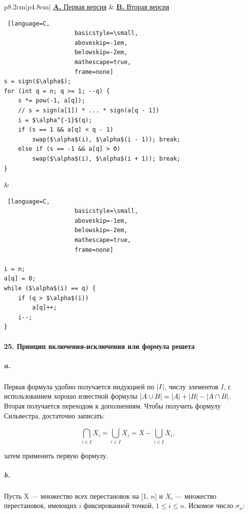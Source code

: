 \documentclass{../../template/mai_book}
\DeclarePairedDelimiter{\abs}{\lvert}{\rvert}
\begin{document}
\begin{framed}
\noindent
\begin{tabular}{p{8.2cm}|p{4.8cm}|}
\centering
\underline{\textbf{A.} Первая версия}  &  \qquad\underline{\textbf{B.} Вторая версия} \\
{\begin{lstlisting} [language=C,
					basicstyle=\small,
					aboveskip=-1em,
					belowskip=-2em,
					mathescape=true,
					frame=none]
s = sign($\alpha$);
for (int q = n; q >= 1; --q) {
	s *= pow(-1, a[q]);
	// s = sign(a[1]) * ... * sign(a[q - 1])
	i = $\alpha^{-1}$(q);
	if (s == 1 && a[q] < q - 1)
		swap($\alpha$(i), $\alpha$(i - 1)); break;
	else if (s == -1 && a[q] > 0)
		swap($\alpha$(i), $\alpha$(i + 1)); break;
}
\end{lstlisting}}&
{\begin{lstlisting} [language=C,
					basicstyle=\small,
					aboveskip=-1em,
					belowskip=-2em,
					mathescape=true,
					frame=none]
					
i = n;
a[q] = 0;
while ($\alpha$(i) == q) {
	if (q > $\alpha$(i))
		a[q]++;
	i--;
}
\end{lstlisting}}
\end{tabular}
\end{framed}

\setcounter{table}{15}
\renewcommand{\tablename}{Алгоритм}


\setcounter{lstlisting}{16}

\paragraph{25. Принцип включения-исключения или формула решета}

\subparagraph{a.} Первая формула удобно получается индукцией по $\abs{I}$, числу элементов $I$, с использованием хорошо известной формулы $\abs{A \cup B} = \abs{A} + \abs{B} - \abs{A \cap B}$. Вторая получается переходом к дополнениям. Чтобы получить формулу Сильвестра, достаточно записать:

\begin{equation*}
\bigcap_{i \in I} \overline{X_i} = \overline{\bigcup_{i \in I} X_i} = X - \bigcup_{i \in I} X_i,
\end{equation*}

\noindent
затем применить первую формулу.

\subparagraph{b.} Пусть X — множество всех перестановок на [1, $n$] и $X_i$ —  множество перестановок, имеющих $i$ фиксированной точкой, $1 \leqslant i \leqslant n$. Искомое число $\sigma_n$:
\end{document}
